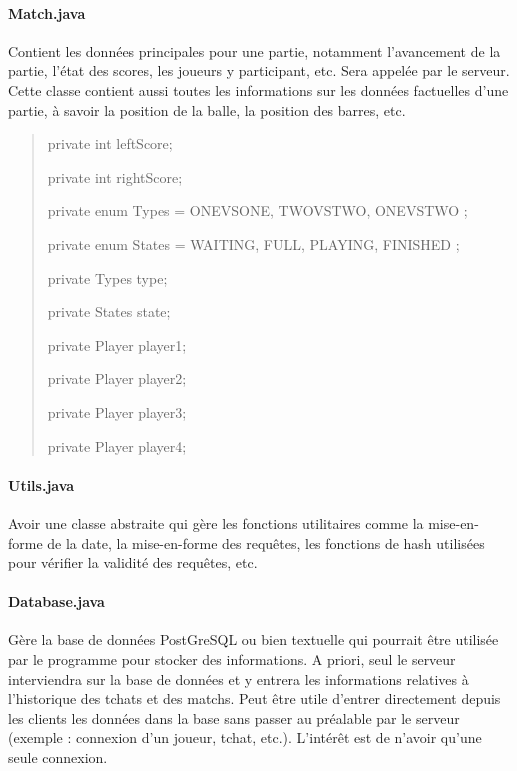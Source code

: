\documentclass[a4paper,12pt]{report}
\begin{document}
\paragraph{Match.java}
Contient les données principales pour une partie, notamment l'avancement de la partie, l'état des scores, les joueurs y participant, etc. Sera appelée par le serveur. Cette classe contient aussi toutes les informations sur les données factuelles d'une partie, à savoir la position de la balle, la position des barres, etc.
\begin{quote}
    private int leftScore;
    
	private int rightScore;
	
	private enum Types = { ONEVSONE, TWOVSTWO, ONEVSTWO };
	
	private enum States = { WAITING, FULL, PLAYING, FINISHED };  
	
	private Types type;
	
	private States state;
	
	private Player player1;
    
	private Player player2;
    
	private Player player3;
    
	private Player player4;
\end{quote}
\paragraph{Utils.java}
Avoir une classe abstraite qui gère les fonctions utilitaires comme la mise-en-forme de la date, la mise-en-forme des requêtes, les fonctions de hash utilisées pour vérifier la validité des requêtes, etc.
\paragraph{Database.java}
Gère la base de données PostGreSQL ou bien textuelle qui pourrait être utilisée par le programme pour stocker des informations. A priori, seul le serveur interviendra sur la base de données et y entrera les informations relatives à l'historique des tchats et des matchs. Peut être utile d'entrer directement depuis les clients les données dans la base sans passer au préalable par le serveur (exemple : connexion d'un joueur, tchat, etc.). L'intérêt est de n'avoir qu'une seule connexion.

\end{document}
